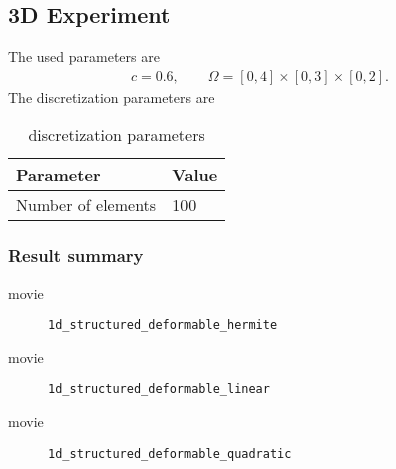 \subsection{3D Experiment}
%
The used parameters are
\begin{equation*}
  \begin{array}{lll}
    c = 0.6,\qquad \Omega = [0,4] \times [0,3] \times [0,2].
  \end{array}
\end{equation*}
The discretization parameters are
\begin{table}[h!]
  \begin{center}
    \begin{tabular}{l|l}
      \textbf{Parameter} & \textbf{Value}\\
      \hline
      Number of elements & 100\\
    \end{tabular}
  \end{center}
  \caption{discretization parameters}
  \label{tab:table1}
\end{table}


\subsubsection{Result summary}
%
%
\begin{frame}{movie}
  \begin{figure}[h!]
    \caption{\lstinline{1d_structured_deformable_hermite}}
  \end{figure} 
\end{frame}



%
\begin{frame}{movie}
  \begin{figure}[h!]
    \caption{\lstinline{1d_structured_deformable_linear}}
  \end{figure} 
\end{frame}



%
\begin{frame}{movie}
  \begin{figure}[h!]
    \caption{\lstinline{1d_structured_deformable_quadratic}}
  \end{figure} 
\end{frame}

